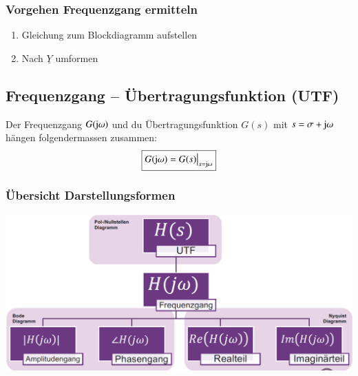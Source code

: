 \subsubsection{Vorgehen Frequenzgang ermitteln}
\begin{enumerate}
    \item Gleichung zum Blockdiagramm aufstellen
    \item Nach $\underline{Y}$ umformen 
\end{enumerate}

\subsection{Frequenzgang -- Übertragungsfunktion (UTF)}

Der Frequenzgang $G(\mathrm{j} \omega)$ und du Übertragungsfunktion $G(s)$ mit $s = \sigma + \mathrm{j} \omega$ hängen folgendermassen zusammen:
$$ \boxed{G(\mathrm{j} \omega) = G(s) \big\vert_{s = \mathrm{j} \omega}} $$

\subsubsection{Übersicht Darstellungsformen}

\begin{center}
    \includegraphics[width=0.75\columnwidth]{images/darstellungen_frequenzgang_utf.png}
\end{center}

